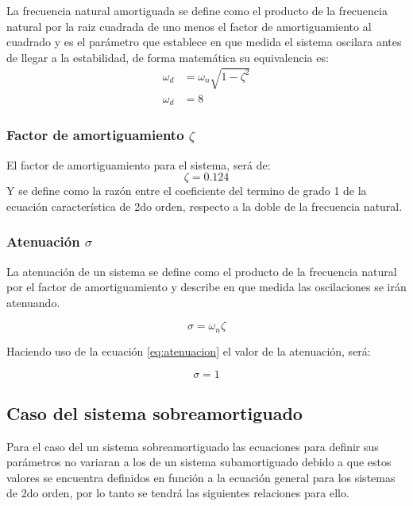\documentclass[conference]{IEEEtran}
\begin{document}
	La frecuencia natural amortiguada se define como el producto de la frecuencia natural por la raiz cuadrada de uno menos el factor de amortiguamiento al cuadrado y es el parámetro que establece en que medida el sistema oscilara antes de llegar a la estabilidad, de forma matemática su equivalencia es:
	\begin{align}
		\omega_d &= \omega_n \sqrt{1 - \zeta^2} \\
		\omega_d &= 8
	\end{align}
	
	\subsubsection{Factor de amortiguamiento $\zeta$}
	El factor de amortiguamiento para el sistema, será de: 
	\begin{equation}
		\zeta = 0.124
		\label{eq:sub-factor-amortiguamiento}
	\end{equation}
	Y se define como la razón entre el coeficiente del termino de grado 1 de la ecuación característica de 2do orden, respecto a la doble de la frecuencia natural.
	
	\subsubsection{Atenuación $\sigma$}
	La atenuación de un sistema se define como el producto de la frecuencia natural por el factor de amortiguamiento y describe en que medida las oscilaciones se irán atenuando.
	
	\begin{equation}
		\sigma = \omega_n \zeta
		\label{eq:atenuacion}
	\end{equation}
	
	Haciendo uso de la ecuación \ref{eq:atenuacion} el valor de la atenuación, será:
	
	\begin{equation}
		\sigma = 1
	\end{equation}
	
	\subsection{Caso del sistema sobreamortiguado}
	
	Para el caso del un sistema sobreamortiguado las ecuaciones para definir sus parámetros no variaran a los de un sistema subamortiguado debido a que estos valores se encuentra definidos en función a la ecuación general para los sistemas de 2do orden, por lo tanto se tendrá las siguientes relaciones para ello.
	
\end{document}
